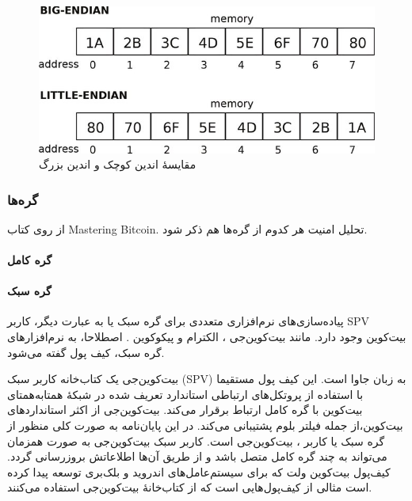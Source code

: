 \begin{figure}[h]
	\centering
	\includegraphics[width=0.7\linewidth]{image/endian}
	\caption{مقایسهٔ اندین کوچک و اندین بزرگ\cite{Grochowski2020}}
	\label{fig:endian}
\end{figure}


\subsubsection{گره‌ها‌}
از روی کتاب Mastering Bitcoin.
تحلیل امنیت‌ هر کدوم از گره‌ها هم ذکر شود.
\paragraph{گره کامل}


\paragraph{گره سبک}

پیاده‌سازی‌های نرم‌افزاری متعددی برای گره سبک یا به عبارت دیگر، کاربر SPV بیت‌کوین وجود دارد. مانند بیت‌کوین‌جی \cite{bitcoinj}، الکترام  
\cite{Electrum}
و پیکوکوین
\cite{Garzik}. 
اصطلاحا، به نرم‌افزار‌های گره سبک، کیف پول گفته می‌شود.

بیت‌کوین‌جی یک کتاب‌خانه کاربر سبک (SPV) به زبان جاوا  است. این کیف پول مستقیما با استفاده از پروتکل‌های ارتباطی استاندارد تعریف شده در شبکهٔ همتا‌به‌همتای بیت‌کوین \cite{P2P_dev,P2P_ref} با گره کامل ارتباط برقرار می‌کند. بیت‌کوین‌جی از اکثر استاندارد‌های بیت‌کوین،‌از جمله فیلتر بلوم \cite{Hearn2013}  پشتیبانی می‌کند. در این پایان‌نامه به صورت کلی منظور از گره سبک یا کاربر ، بیت‌کوین‌جی است. کاربر سبک بیت‌کوین‌جی به صورت همزمان می‌تواند به چند گره کامل متصل باشد و از طریق آن‌ها اطلاعاتش بروزرسانی گردد. کیف‌پول‌ 
بیت‌کوین ولت که برای سیستم‌عامل‌های اندروید و بلک‌بری توسعه پیدا کرده است مثالی از کیف‌پول‌هایی است که از کتاب‌خانهٔ بیت‌کوین‌جی استفاده می‌کنند.

